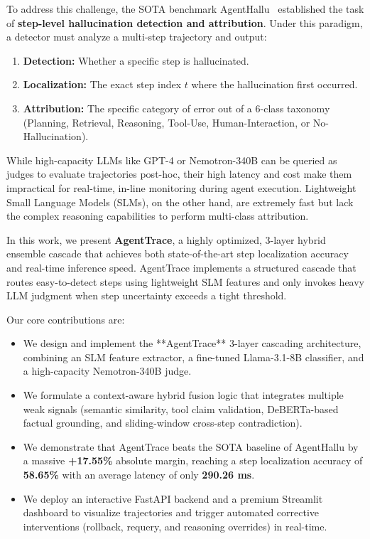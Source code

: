 \documentclass[11pt,a4paper]{article}
\begin{document}
To address this challenge, the SOTA benchmark AgentHallu~\cite{agenthallu2026} established the task of \textbf{step-level hallucination detection and attribution}. Under this paradigm, a detector must analyze a multi-step trajectory and output:
\begin{enumerate}
    \item \textbf{Detection:} Whether a specific step is hallucinated.
    \item \textbf{Localization:} The exact step index $t$ where the hallucination first occurred.
    \item \textbf{Attribution:} The specific category of error out of a 6-class taxonomy (Planning, Retrieval, Reasoning, Tool-Use, Human-Interaction, or No-Hallucination).
\end{enumerate}

While high-capacity LLMs like GPT-4 or Nemotron-340B can be queried as judges to evaluate trajectories post-hoc, their high latency and cost make them impractical for real-time, in-line monitoring during agent execution. Lightweight Small Language Models (SLMs), on the other hand, are extremely fast but lack the complex reasoning capabilities to perform multi-class attribution.

In this work, we present \textbf{AgentTrace}, a highly optimized, 3-layer hybrid ensemble cascade that achieves both state-of-the-art step localization accuracy and real-time inference speed. AgentTrace implements a structured cascade that routes easy-to-detect steps using lightweight SLM features and only invokes heavy LLM judgment when step uncertainty exceeds a tight threshold. 

Our core contributions are:
\begin{itemize}
    \item We design and implement the **AgentTrace** 3-layer cascading architecture, combining an SLM feature extractor, a fine-tuned Llama-3.1-8B classifier, and a high-capacity Nemotron-340B judge.
    \item We formulate a context-aware hybrid fusion logic that integrates multiple weak signals (semantic similarity, tool claim validation, DeBERTa-based factual grounding, and sliding-window cross-step contradiction).
    \item We demonstrate that AgentTrace beats the SOTA baseline of AgentHallu by a massive \textbf{+17.55\%} absolute margin, reaching a step localization accuracy of \textbf{58.65\%} with an average latency of only \textbf{290.26 ms}.
    \item We deploy an interactive FastAPI backend and a premium Streamlit dashboard to visualize trajectories and trigger automated corrective interventions (rollback, requery, and reasoning overrides) in real-time.
\end{itemize}
\end{document}
